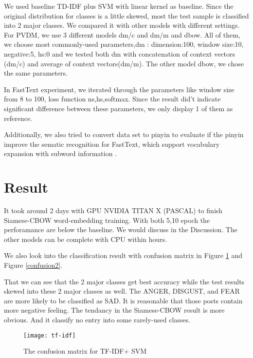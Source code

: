 We used baseline TD-IDF plus SVM with linear kernel as baseline. 
Since the original distribution for classes is a little skewed, most the test sample is classified into 2 major classes.
We compared it with other models with different settings. \\

For PVDM, we use 3 different models dm/c and dm/m and dbow. All of them, we choose most commonly-used parameters,dm : dimension:100, window size:10, negative:5, hs:0 and we tested both dm with concatenation of context vectors (dm/c) and average of context vectors(dm/m). 
The other model dbow, we chose the same parameters.

In FastText experiment, we iterated through the parameters like window size from 8 to 100, 
loss function ns,hs,softmax.  Since the result did't indicate significant difference between these parameters, 
we only display 1 of them as reference.

Additionally, we also tried to convert data set to pinyin to evaluate 
if the pinyin improve the sematic recognition for FastText, 
which support vocabulary expansion with subword information \cite{bojanowski2016enriching}. 

\section{Result}

It took around 2 days with GPU NVIDIA TITAN X (PASCAL) to finish Siamese-CBOW word-embedding training. With both 5,10 epoch the perforamance are below the baseline. 
We would discuss in the Discussion. The other models can be complete with CPU within hours.

We also look into the classification result with confusion matrix in Figure \ref{confusion1} and Figure \ref{confusion2}.

That we can see that the 2 major classes get best accuracy while the test results skewed into these 2 major classes as well.  
The ANGER, DISGUST, and FEAR are more likely to be classified as SAD. It is reasonable that those posts contain more negative feeling.
The tendancy in the Siamese-CBOW result is more obvious. And it classify no entry into some rarely-used classes.

\begin{figure}[h]
    \centering
	\texttt{[image: tf-idf]}
    \caption{The confusion matrix for TF-IDF+ SVM}
    \label{confusion1}
\end{figure}

